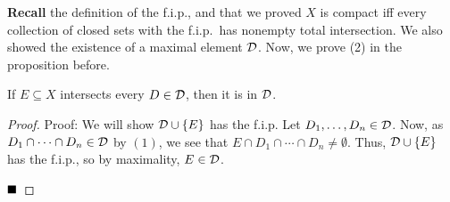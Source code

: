 
\textbf{Recall} the definition of the f.i.p., and that we proved $X$ is compact iff every collection of closed sets with the f.i.p.\ has nonempty total intersection. We also showed the existence of a maximal element $\cal{D}$. Now, we prove (2) in the proposition before.

\begin{lemma}
    If $E \subseteq X$ intersects every $D \in \cal{D}$, then it is in $\cal{D}$.
\end{lemma}
\begin{proof}{Proof:}
    We will show $\cal{D} \cup \{E\}$ has the f.i.p. Let $D_1, \ldots, D_n \in \cal{D}$. Now, as $D_1 \cap \cdots \cap D_n \in \cal{D}$ by $(1)$, we see that $E \cap D_1 \cap \cdots \cap D_n \ne \emptyset$. Thus, $\cal{D} \cup \{E\}$ has the f.i.p., so by maximality, $E \in \cal{D}$. 

    $\qed$
\end{proof}

